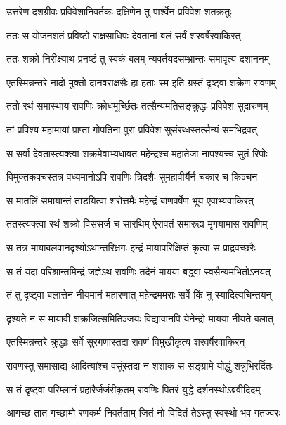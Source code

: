 \twolineshloka
{उत्तरेण दशग्रीवः प्रविवेशानिवर्तकः}
{दक्षिणेन तु पार्श्वेन प्रविवेश शतक्रतुः} %

\twolineshloka
{ततः स योजनशतं प्रविष्टो राक्षसाधिपः}
{देवतानां बलं सर्वं शरवर्षैरवाकिरत्} %

\twolineshloka
{ततः शक्रो निरीक्ष्याथ प्रनष्टं तु स्वकं बलम्}
{न्यवर्तयदसम्भ्रान्तः समावृत्य दशाननम्} %

\twolineshloka
{एतस्मिन्नन्तरे नादो मुक्तो दानवराक्षसैः}
{हा हताः स्म इति ग्रस्तं दृष्ट्वा शक्रेण रावणम्} %

\twolineshloka
{ततो रथं समास्थाय रावणिः क्रोधमूर्च्छितः}
{तत्सैन्यमतिसङ्क्रुद्धः प्रविवेश सुदारुणम्} %

\twolineshloka
{तां प्रविश्य महामायां प्राप्तां गोपतिना पुरा}
{प्रविवेश सुसंरब्धस्तत्सैन्यं समभिद्रवत्} %

\twolineshloka
{स सर्वा देवतास्त्यक्त्वा शक्रमेवाभ्यधावत}
{महेन्द्रश्च महातेजा नापश्यच्च सुतं रिपोः} %

\twolineshloka
{विमुक्तकवचस्तत्र वध्यमानोऽपि रावणिः}
{त्रिदशैः सुमहावीर्यैर्न चकार च किञ्चन} %

\twolineshloka
{स मातलिं समायान्तं ताडयित्वा शरोत्तमैः}
{महेन्द्रं बाणवर्षेण भूय एवाभ्यवाकिरत्} %

\twolineshloka
{ततस्त्यक्त्वा रथं शक्रो विससर्ज च सारथिम्}
{ऐरावतं समारुह्य मृगयामास रावणिम्} %

\twolineshloka
{स तत्र मायाबलवानदृश्योऽथान्तरिक्षगः}
{इन्द्रं मायापरिक्षिप्तं कृत्वा स प्राद्रवच्छरैः} %

\twolineshloka
{स तं यदा परिश्रान्तमिन्द्रं जज्ञेऽथ रावणिः}
{तदैनं मायया बद्ध्वा स्वसैन्यमभितोऽनयत्} %

\twolineshloka
{तं तु दृष्ट्वा बलात्तेन नीयमानं महारणात्}
{महेन्द्रममराः सर्वे किं नु स्यादित्यचिन्तयन्} %

\twolineshloka
{दृश्यते न स मायावी शक्रजित्समितिञ्जयः}
{विद्यावानपि येनेन्द्रो मायया नीयते बलात्} %

\twolineshloka
{एतस्मिन्नन्तरे क्रुद्धाः सर्वे सुरगणास्तदा}
{रावणं विमुखीकृत्य शरवर्षैरवाकिरन्} %

\twolineshloka
{रावणस्तु समासाद्य आदित्यांश्च वसूंस्तदा}
{न शशाक स सङ्ग्रामे योद्धुं शत्रुभिरर्दितः} %

\twolineshloka
{स तं दृष्ट्वा परिम्लानं प्रहारैर्जर्जरीकृतम्}
{रावणिः पितरं युद्धे दर्शनस्थोऽब्रवीदिदम्} %

\twolineshloka
{आगच्छ तात गच्छामो रणकर्म निवर्तताम्}
{जितं नो विदितं तेऽस्तु स्वस्थो भव गतज्वरः} %


